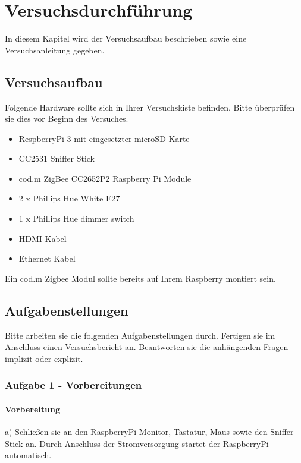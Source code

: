 \chapter{Versuchsdurchführung}

In diesem Kapitel wird der Versuchsaufbau beschrieben sowie eine Versuchsanleitung gegeben.

\section{Versuchsaufbau}

Folgende Hardware sollte sich in Ihrer Versuchskiste befinden. Bitte überprüfen sie dies vor Beginn des Versuches.

\begin{itemize}
    \item RespberryPi 3 mit eingesetzter microSD-Karte
    \item CC2531 Sniffer Stick
    \item cod.m ZigBee CC2652P2 Raspberry Pi Module
    \item 2 x Phillips Hue White E27
    \item 1 x Phillips Hue dimmer switch
    \item HDMI Kabel
    \item Ethernet Kabel
\end{itemize}

Ein cod.m Zigbee Modul sollte bereits auf Ihrem Raspberry montiert sein. 

\section{Aufgabenstellungen}

Bitte arbeiten sie die folgenden Aufgabenstellungen durch. Fertigen sie im Anschluss einen Versuchsbericht an. Beantworten sie die anhängenden Fragen
implizit oder explizit.

\subsection{Aufgabe 1 - Vorbereitungen}

\subsubsection{Vorbereitung}
a) Schließen sie an den RaspberryPi Monitor, Tastatur, Maus sowie den Sniffer-Stick an. Durch Anschluss der
Stromversorgung startet der RaspberryPi automatisch. 

